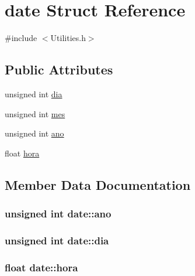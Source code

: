 \hypertarget{structdate}{}\section{date Struct Reference}
\label{structdate}


{\ttfamily \#include $<$Utilities.\+h$>$}

\subsection*{Public Attributes}
\begin{DoxyCompactItemize}
\item 
unsigned int \hyperlink{structdate_aa1b5940ff8435cabd727231a1a29eb10}{dia}
\item 
unsigned int \hyperlink{structdate_a017e212612160fd138ba2ebdc6cda30d}{mes}
\item 
unsigned int \hyperlink{structdate_af5652663241b4849b78462207f6188a1}{ano}
\item 
float \hyperlink{structdate_a6acf0357ff9f37e19d6579eb33121bdc}{hora}
\end{DoxyCompactItemize}


\subsection{Member Data Documentation}
\hypertarget{structdate_af5652663241b4849b78462207f6188a1}{}
\subsubsection[{ano}]{\setlength{\rightskip}{0pt plus 5cm}unsigned int date\+::ano}\label{structdate_af5652663241b4849b78462207f6188a1}
\hypertarget{structdate_aa1b5940ff8435cabd727231a1a29eb10}{}
\subsubsection[{dia}]{\setlength{\rightskip}{0pt plus 5cm}unsigned int date\+::dia}\label{structdate_aa1b5940ff8435cabd727231a1a29eb10}
\hypertarget{structdate_a6acf0357ff9f37e19d6579eb33121bdc}{}
\subsubsection[{hora}]{\setlength{\rightskip}{0pt plus 5cm}float date\+::hora}\label{structdate_a6acf0357ff9f37e19d6579eb33121bdc}
\hypertarget{structdate_a017e212612160fd138ba2ebdc6cda30d}{}
